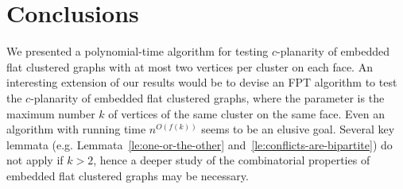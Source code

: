 \documentclass[letter,runningheads]{llncs}
\begin{document}
\section{Conclusions} \label{se:conclusions}

We presented a polynomial-time algorithm for testing $c$-planarity of embedded flat clustered graphs with at most two vertices per cluster on each face. An interesting extension of our results would be to devise an FPT algorithm to test the $c$-planarity of embedded flat clustered graphs, where the parameter is the maximum number $k$ of vertices of the same cluster on the same face. Even an algorithm with running time $n^{O(f(k))}$ seems to be an elusive goal. Several key lemmata (e.g. Lemmata~\ref{le:one-or-the-other} and~\ref{le:conflicts-are-bipartite}) do not apply if $k>2$, hence a deeper study of the combinatorial properties of embedded flat clustered graphs may be necessary.







\end{document}
